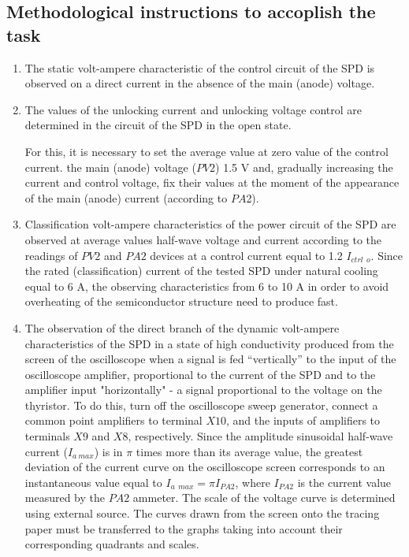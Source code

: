 \documentclass[a4paper,14pt]{article}
\begin{document}
\subsection{Methodological instructions to accoplish the task}

\begin{enumerate}
\item The static volt-ampere characteristic of the control circuit of the SPD is observed on a direct current
in the absence of the main (anode) voltage.

\item The values of the unlocking current and unlocking voltage control are determined in the circuit
of the SPD in the open state.

For this, it is necessary to set the average value at zero value of the control current.
the main (anode) voltage ($PV2$) 1.5 V and, gradually increasing the current and control voltage,
fix their values at the moment of the appearance of the main (anode) current (according to $PA$2).

\item Classification volt-ampere characteristics of the power circuit of the SPD are observed at average values
half-wave voltage and current according to the readings of $PV2$ and $PA2$ devices at a control current equal to
1.2 $I_{ctrl\:\:o}$. Since the rated (classification) current of the tested SPD under natural cooling
equal to 6 A, the observing characteristics from 6 to 10 A in order to avoid overheating of the semiconductor structure
need to produce fast.

\item The observation of the direct branch of the dynamic volt-ampere characteristics of the SPD 
in a state of high conductivity
produced from the screen of the oscilloscope when a signal 
is fed “vertically” to the input of the oscilloscope amplifier,
proportional to the current of the SPD and to the amplifier 
input "horizontally" - a signal proportional to the voltage
on the thyristor. To do this, turn off the oscilloscope sweep generator, connect a common point
amplifiers to terminal $X10$, and the inputs of amplifiers to terminals $X9$ and $X8$, respectively. 
Since the amplitude
sinusoidal half-wave current ($I_{a\:max}$) is in $\pi$ times more than its average value, 
the greatest deviation of the current curve on the oscilloscope screen corresponds 
to an instantaneous value equal to $I_{a\:\:max} = \pi I_{PA2}$,
where $I_{PA2}$ is the current value measured by the $PA2$ ammeter. 
The scale of the voltage curve is determined using external source. 
The curves drawn from the screen onto the tracing paper must be transferred to the graphs 
taking into account
their corresponding quadrants and scales.


\end{enumerate}
\end{document}
